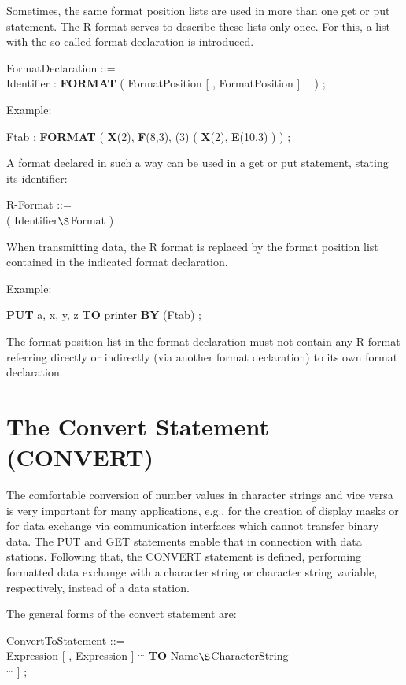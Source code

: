 Sometimes, the same format position lists are used in more than one get
or put statement. The R format serves to describe these lists only
once. For this, a list with the so-called format declaration is
introduced.

FormatDeclaration ::=\\
\x Identifier : {\bf FORMAT} ( FormatPosition [ , FormatPosition ] $^{...}$ ) ;

Example:

Ftab : {\bf FORMAT} ( {\bf X}(2), {\bf F}(8,3), (3) ( {\bf X}(2), {\bf E}(10,3) ) ) ;

A format declared in such a way can be used in a get or put statement,
stating its identifier:

R-Format ::=\\
 ( Identifier$\S $Format )

When transmitting data, the R format is replaced by the format position
list contained in the indicated format declaration.

Example:

{\bf PUT} a, x, y, z {\bf TO} printer {\bf BY }(Ftab) ;

The format position list in the format declaration must not contain any
R format referring directly or indirectly (via another format
declaration) to its own format declaration.

\section{The Convert Statement (CONVERT)}   %
\label{sec_convert}

The comfortable conversion of number values in character strings and
vice versa is very important for many applications, e.g., for the
creation of display masks or for data exchange via communication
interfaces which cannot transfer binary data. The PUT and GET
statements enable that in connection with data stations. Following
that, the CONVERT statement is defined, performing formatted data
exchange with a character string or character string variable,
respectively, instead of a data station.

The general forms of the convert statement are:

ConvertToStatement ::=\\
 Expression [ , Expression ] $^{...}$ {\bf TO} Name$\S $CharacterString\\
\x [ {\bf BY} FormatPositionConvert [ FormatPositionConvert ] $^{...}$ ] ;

